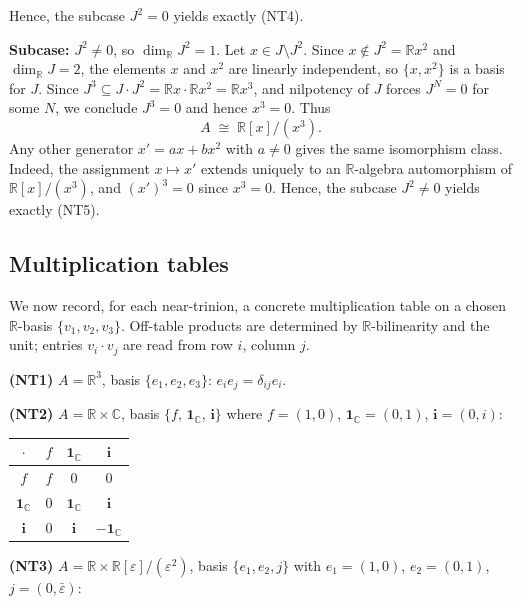 \documentclass{amsart}
\theoremstyle{plain}
\theoremstyle{definition}
\theoremstyle{remark}
\newcommand{\RR}{\mathbb{R}}
\newcommand{\CC}{\mathbb{C}}
\begin{document}
Hence, the subcase $J^2=0$ yields exactly \textup{(NT4)}.

\medskip
\noindent\textbf{Subcase:} $J^2 \neq 0$, so $\dim_\RR J^2 = 1$.
Let $x \in J \setminus J^2$.
Since $x \notin J^2 = \RR x^2$ and $\dim_\RR J = 2$, the elements
$x$ and $x^2$ are linearly independent, so $\{x, x^2\}$ is a basis for $J$.
Since $J^3 \subseteq J \cdot J^2 = \RR x \cdot \RR x^2 = \RR x^3$,
and nilpotency of $J$ forces $J^N = 0$ for some $N$, we conclude
$J^3 = 0$ and hence $x^3 = 0$.
Thus
\[
  \boxed{A \;\cong\; \RR[x]/(x^3). \tag{NT5}}
\]
Any other generator $x' = ax + bx^2$ with $a \neq 0$ gives the same
isomorphism class. Indeed, the assignment $x \mapsto x'$ extends uniquely to an $\RR$-algebra
automorphism of $\RR[x]/(x^3)$, and $(x')^3 = 0$ since $x^3 = 0$. 
Hence, the subcase $J^2\neq 0$ yields exactly \textup{(NT5)}.

\subsection{Multiplication tables}
\label{sec:multtables}

We now record, for each near-trinion, a concrete multiplication table
on a chosen $\RR$-basis $\{v_1, v_2, v_3\}$.  Off-table products are
determined by $\RR$-bilinearity and the unit; entries $v_i \cdot v_j$
are read from row $i$, column $j$.  

\medskip\noindent
\textbf{(NT1)} $A = \RR^3$, basis $\{e_1, e_2, e_3\}$:
$e_i e_j = \delta_{ij} e_i$.

\medskip\noindent
\textbf{(NT2)} $A = \RR \times \CC$,
basis $\{f,\, \mathbf{1}_\CC,\, \mathbf{i}\}$
where $f = (1,0)$, $\mathbf{1}_\CC = (0,1)$, $\mathbf{i} = (0,i)$:

\begin{center}
\renewcommand{\arraystretch}{1.2}
\begin{tabular}{c|ccc}
  $\cdot$ & $f$ & $\mathbf{1}_\CC$ & $\mathbf{i}$ \\\hline
  $f$             & $f$              & $0$               & $0$ \\
  $\mathbf{1}_\CC$& $0$              & $\mathbf{1}_\CC$  & $\mathbf{i}$ \\
  $\mathbf{i}$    & $0$              & $\mathbf{i}$      & $-\mathbf{1}_\CC$ \\
\end{tabular}
\end{center}

\medskip\noindent
\textbf{(NT3)} $A = \RR \times \RR[\varepsilon]/(\varepsilon^2)$,
basis $\{e_1, e_2, j\}$ with $e_1 = (1,0)$, $e_2 = (0,1)$,
$j = (0,\bar\varepsilon)$:
\end{document}
